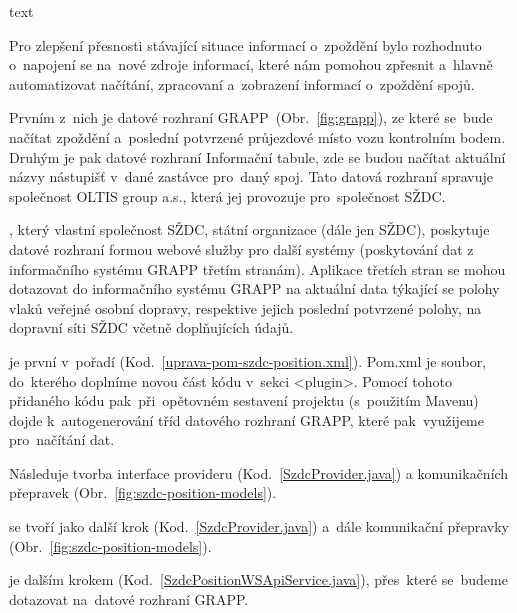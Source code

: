 text


Pro zlepšení přesnosti stávající situace informací o~zpoždění bylo rozhodnuto o~napojení se na~nové zdroje informací, které nám pomohou zpřesnit a~hlavně automatizovat načítání, zpracovaní a~zobrazení informací o~zpoždění spojů.

Prvním z~nich je datové rozhraní GRAPP~(Obr.~\ref{fig:grapp}), ze které se~bude načítat zpoždění a~poslední potvrzené průjezdové místo vozu kontrolním bodem. Druhým je pak datové rozhraní Informační tabule, zde se budou načítat aktuální názvy nástupišť v~dané zastávce pro~daný spoj. Tato datová rozhraní spravuje společnost OLTIS group a.s., která jej provozuje pro~společnost SŽDC.



, který vlastní společnost SŽDC, státní organizace (dále jen SŽDC), poskytuje datové rozhraní formou webové služby pro další systémy (poskytování dat z informačního systému GRAPP třetím stranám). Aplikace třetích stran se mohou dotazovat do informačního systému GRAPP na aktuální data týkající se polohy vlaků veřejné osobní dopravy, respektive jejich poslední potvrzené polohy, na dopravní síti SŽDC včetně doplňujících údajů.

je první v~pořadí (Kod.~\ref{uprava-pom-szdc-position.xml}). Pom.xml je soubor, do~kterého doplníme novou část kódu v~sekci <plugin>. Pomocí tohoto přidaného kódu pak~při~opětovném sestavení projektu (s~použitím Mavenu) dojde k~autogenerování tříd datového rozhraní GRAPP, které pak~využijeme pro~načítání dat.

Následuje tvorba interface provideru (Kod.~\ref{SzdcProvider.java}) a komunikačních přepravek (Obr.~\ref{fig:szdc-position-models}).

 se tvoří jako další krok (Kod.~\ref{SzdcProvider.java}) a~dále komunikační přepravky (Obr.~\ref{fig:szdc-position-models}).
 	

 je dalším krokem (Kod.~\ref{SzdcPositionWSApiService.java}), přes~které se~budeme dotazovat na~datové rozhraní GRAPP.

